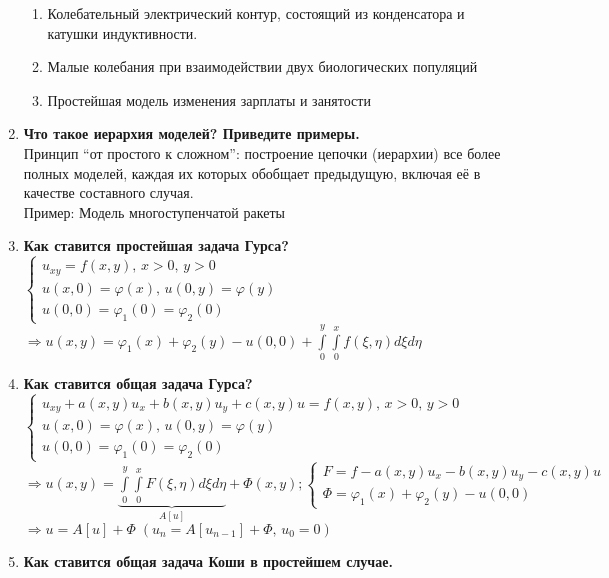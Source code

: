 \begin{enumerate}[label=\textbf{\underline{\arabic*.}}]
\begin{enumerate}
      \item Колебательный электрический контур, состоящий из конденсатора и катушки индуктивности.
      \item Малые колебания при взаимодействии двух биологических популяций
      \item Простейшая модель изменения зарплаты и занятости
      \end{enumerate}
\item \textbf{Что такое иерархия моделей? Приведите примеры.}\\
      Принцип ``от простого к сложном'': построение цепочки (иерархии) все более полных моделей, каждая их которых обобщает предыдущую, включая её в качестве составного случая.\\
      Пример: Модель многоступенчатой ракеты
\item \textbf{Как ставится простейшая задача Гурса?}\\
      $\left\{\begin{array}{l}
            u_{xy}=f(x,y),\,x>0,\,y>0\\
            u(x,0)=\varphi(x),\,u(0,y)=\varphi(y)\\
            u(0,0)=\varphi_1(0)=\varphi_2(0)
      \end{array}\right. $\\$\Rightarrow
      u(x,y)=\varphi_1(x)+\varphi_2(y)-u(0,0)+ \int\limits_0^y \int\limits_0^x f(\xi,\eta)d\xi d\eta $\\
\item \textbf{Как ставится общая задача Гурса?}\\
      $\left\{\begin{array}{l}
            u_{xy}+a(x,y)u_x+b(x,y)u_y+c(x,y)u=f(x,y),\,x>0,\,y>0\\
            u(x,0)=\varphi(x),\,u(0,y)=\varphi(y)\\
            u(0,0)=\varphi_1(0)=\varphi_2(0)
      \end{array}\right. $\\$\Rightarrow
      u(x,y)=\underbrace{\int\limits_0^y \int\limits_0^x F(\xi,\eta)d\xi d\eta}_{A\left[u\right]} + \Phi(x,y);
      \left\{\begin{array}{l}
            F = f-a(x,y)u_x-b(x,y)u_y-c(x,y)u\\
            \Phi = \varphi_1(x)+\varphi_2(y)-u(0,0)
      \end{array}\right. $\\$
      \Rightarrow u=A[u]+\Phi\;(u_n=A[u_{n-1}]+\Phi,\,u_0=0) $
\item \textbf{Как ставится общая задача Коши в простейшем случае.}

\end{enumerate}
